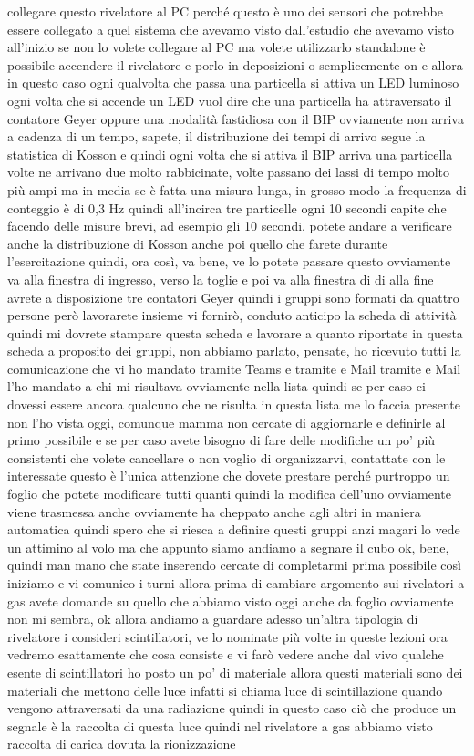 collegare questo rivelatore al PC perché questo è uno dei sensori che potrebbe essere collegato a quel sistema che avevamo visto dall'estudio che avevamo visto all'inizio se non lo volete collegare al PC ma volete utilizzarlo standalone è possibile accendere il rivelatore e porlo in deposizioni o semplicemente on e allora in questo caso ogni qualvolta che passa una particella si attiva un LED luminoso ogni volta che si accende un LED vuol dire che una particella ha attraversato il contatore Geyer oppure una modalità fastidiosa con il BIP ovviamente non arriva a cadenza di un tempo, sapete, il distribuzione dei tempi di arrivo segue la statistica di Kosson e quindi ogni volta che si attiva il BIP arriva una particella volte ne arrivano due molto rabbicinate, volte passano dei lassi di tempo molto più ampi ma in media se è fatta una misura lunga, in grosso modo la frequenza di conteggio è di 0,3 Hz quindi all'incirca tre particelle ogni 10 secondi capite che facendo delle misure brevi, ad esempio gli 10 secondi, potete andare a verificare anche la distribuzione di Kosson anche poi quello che farete durante l'esercitazione quindi, ora così, va bene, ve lo potete passare questo ovviamente va alla finestra di ingresso, verso la toglie e poi va alla finestra di di alla fine avrete a disposizione tre contatori Geyer quindi i gruppi sono formati da quattro persone però lavorarete insieme vi fornirò, conduto anticipo la scheda di attività quindi mi dovrete stampare questa scheda e lavorare a quanto riportate in questa scheda a proposito dei gruppi, non abbiamo parlato, pensate, ho ricevuto tutti la comunicazione che vi ho mandato tramite Teams e tramite e Mail tramite e Mail l'ho mandato a chi mi risultava ovviamente nella lista quindi se per caso ci dovessi essere ancora qualcuno che ne risulta in questa lista me lo faccia presente non l'ho vista oggi, comunque mamma non cercate di aggiornarle e definirle al primo possibile e se per caso avete bisogno di fare delle modifiche un po' più consistenti che volete cancellare o non voglio di organizzarvi, contattate con le interessate questo è l'unica attenzione che dovete prestare perché purtroppo un foglio che potete modificare tutti quanti quindi la modifica dell'uno ovviamente viene trasmessa anche ovviamente ha cheppato anche agli altri in maniera automatica quindi spero che si riesca a definire questi gruppi anzi magari lo vede un attimino al volo ma che appunto siamo andiamo a segnare il cubo ok, bene, quindi man mano che state inserendo cercate di completarmi prima possibile così iniziamo e vi comunico i turni allora prima di cambiare argomento sui rivelatori a gas avete domande su quello che abbiamo visto oggi anche da foglio ovviamente non mi sembra, ok allora andiamo a guardare adesso un'altra tipologia di rivelatore i consideri scintillatori, ve lo nominate più volte in queste lezioni ora vedremo esattamente che cosa consiste e vi farò vedere anche dal vivo qualche esente di scintillatori ho posto un po' di materiale allora questi materiali sono dei materiali che mettono delle luce infatti si chiama luce di scintillazione quando vengono attraversati da una radiazione quindi in questo caso ciò che produce un segnale è la raccolta di questa luce quindi nel rivelatore a gas abbiamo visto raccolta di carica dovuta la rionizzazione 
